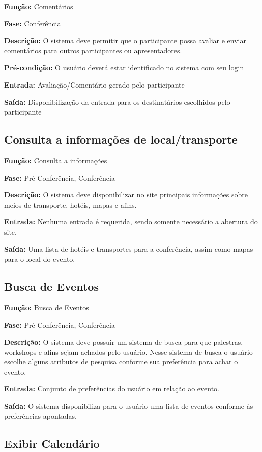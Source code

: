 \documentclass[letter]{article}
\begin{document}
\textbf{Função:} Comentários

\textbf{Fase:} Conferência

\textbf{Descrição:} O sistema deve permitir que o participante possa avaliar e enviar comentários para outros participantes ou apresentadores.

\textbf{Pré-condição:} O usuário deverá estar identificado no sistema com seu login

\textbf{Entrada:} Avaliação/Comentário gerado pelo participante

\textbf{Saída:} Disponibilização da entrada para os destinatários escolhidos pelo participante


\subsection{ Consulta a informações de local/transporte}
\textbf{Função:} Consulta a informações

\textbf{Fase:} Pré-Conferência, Conferência

\textbf{Descrição:} O sistema deve disponibilizar no site principais informações sobre meios de transporte, hotéis, mapas e afins.

\textbf{Entrada:} Nenhuma entrada é requerida, sendo somente necessário a abertura do site.

\textbf{Saída:} Uma lista de hotéis e transportes para a conferência, assim como mapas para o local do evento.


\subsection{ Busca de Eventos}

\textbf{Função:} Busca de Eventos

\textbf{Fase:} Pré-Conferência, Conferência

\textbf{Descrição:} O sistema deve possuir um sistema de busca para que palestras, workshops e afins sejam achados pelo usuário. Nesse sistema de busca o usuário escolhe alguns atributos de pesquisa conforme sua preferência para achar o evento.

\textbf{Entrada:} Conjunto de preferências do usuário em relação ao evento.

\textbf{Saída:} O sistema disponibiliza para o usuário uma lista de eventos conforme às preferências apontadas.



\subsection{ Exibir Calendário}
\end{document}
